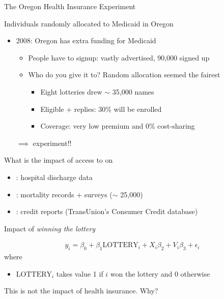 \begin{frame}{The Oregon Health Insurance Experiment}

    Individuals randomly allocated to Medicaid in Oregon
    \begin{itemize}
        \item 2008: Oregon has extra funding for Medicaid
        \begin{itemize}
            \item People have to signup: vastly advertised, 90,000 signed up
            \item Who do you give it to? Random allocation seemed the fairest
            \begin{itemize}
                \item Eight lotteries drew $\sim$ 35,000 names
                \item Eligible + replies: 30\% will be enrolled
                \item Coverage: very low premium and 0\% cost-sharing
            \end{itemize}
        \end{itemize}
        $\implies$  experiment!!
    \end{itemize}
    \vspace{3mm}

    What is the impact of access to  on
    \begin{itemize}
        \item {}: hospital discharge data
        \item {}: mortality records + surveys ($\sim$ 25,000)
        \item {}: credit reports (TransUnion's Consumer Credit database)
    \end{itemize}

\end{frame}
\begin{frame}{Impact of \textit{winning the lottery}}

    \vspace{-3mm}
    \begin{align*}
        y_{i} = \beta_0 + \beta_1 \text{LOTTERY}_i + X_{i} \beta_2 + V_{i} \beta_3 + \epsilon_{i}
    \end{align*}
    where
    \begin{itemize}
        \item $\text{LOTTERY}_i$ takes value 1 if $i$ won the lottery and 0 otherwise
    \end{itemize}
    \vspace{7mm}

    This is not the impact of health insurance. Why?
\end{frame}
